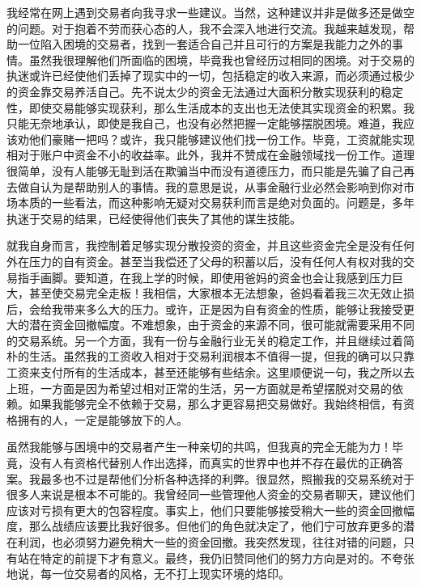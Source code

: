 我经常在网上遇到交易者向我寻求一些建议。当然，这种建议并非是做多还是做空的问题。对于抱着不劳而获心态的人，我不会深入地进行交流。我越来越发现，帮助一位陷入困境的交易者，找到一套适合自己并且可行的方案是我能力之外的事情。虽然我很理解他们所面临的困境，毕竟我也曾经历过相同的困境。对于交易的执迷或许已经使他们丢掉了现实中的一切，包括稳定的收入来源，而必须通过极少的资金靠交易养活自己。先不说太少的资金无法通过大面积分散实现获利的稳定性，即使交易能够实现获利，那么生活成本的支出也无法使其实现资金的积累。我只能无奈地承认，即使是我自己，也没有必然把握一定能够摆脱困境。难道，我应该劝他们豪赌一把吗？或许，我只能够建议他们找一份工作。毕竟，工资就能实现相对于账户中资金不小的收益率。此外，我并不赞成在金融领域找一份工作。道理很简单，没有人能够无耻到活在欺骗当中而没有道德压力，而只能是先骗了自己再去做自认为是帮助别人的事情。我的意思是说，从事金融行业必然会影响到你对市场本质的一些看法，而这种影响无疑对交易获利而言是绝对负面的。问题是，多年执迷于交易的结果，已经使得他们丧失了其他的谋生技能。

就我自身而言，我控制着足够实现分散投资的资金，并且这些资金完全是没有任何外在压力的自有资金。甚至当我偿还了父母的积蓄以后，没有任何人有权对我的交易指手画脚。要知道，在我上学的时候，即使用爸妈的资金也会让我感到压力巨大，甚至使交易完全走板！我相信，大家根本无法想象，爸妈看着我三次无效止损后，会给我带来多么大的压力。或许，正是因为自有资金的性质，能够让我接受更大的潜在资金回撤幅度。不难想象，由于资金的来源不同，很可能就需要采用不同的交易系统。另一个方面，我有一份与金融行业无关的稳定工作，并且继续过着简朴的生活。虽然我的工资收入相对于交易利润根本不值得一提，但我的确可以只靠工资来支付所有的生活成本，甚至还能够有些结余。这里顺便说一句，我之所以去上班，一方面是因为希望过相对正常的生活，另一方面就是希望摆脱对交易的依赖。如果我能够完全不依赖于交易，那么才更容易把交易做好。我始终相信，有资格拥有的人，一定是能够放下的人。

虽然我能够与困境中的交易者产生一种亲切的共鸣，但我真的完全无能为力！毕竟，没有人有资格代替别人作出选择，而真实的世界中也并不存在最优的正确答案。我最多也不过是帮他们分析各种选择的利弊。很显然，照搬我的交易系统对于很多人来说是根本不可能的。我曾经同一些管理他人资金的交易者聊天，建议他们应该对亏损有更大的包容程度。事实上，他们只要能够接受稍大一些的资金回撤幅度，那么战绩应该要比我好很多。但他们的角色就决定了，他们宁可放弃更多的潜在利润，也必须努力避免稍大一些的资金回撤。我突然发现，往往对错的问题，只有站在特定的前提下才有意义。最终，我仍旧赞同他们的努力方向是对的。不夸张地说，每一位交易者的风格，无不打上现实环境的烙印。

